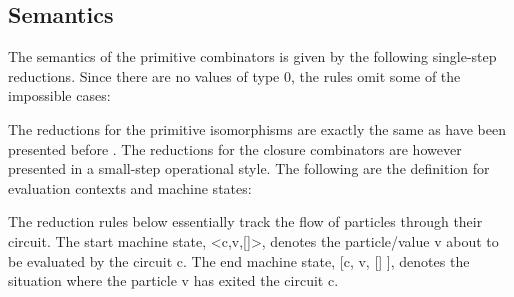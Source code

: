 \documentclass[preprint]{sigplanconf}
\begin{document}
{\subsection{Semantics}

The semantics of the primitive combinators is given by the following
single-step reductions. Since there are no values of type {{0}}, the rules
omit some of the impossible cases:
\begin{scriptsize}
\end{scriptsize}

The reductions for the primitive isomorphisms are exactly the same as
have been presented before \cite{infeffects}. The reductions for the
closure combinators are however presented in a small-step operational
style. The following are the definition for evaluation contexts and
machine states:


The reduction rules below essentially track the flow of particles
through their circuit. The start machine state, {{<c,v,[]>}}, denotes
the particle/value {{v}} about to be evaluated by the circuit
{{c}}. The end machine state, {{[c, v, [] ]}}, denotes the situation
where the particle {{v}} has exited the circuit {{c}}.



}
\end{document}
